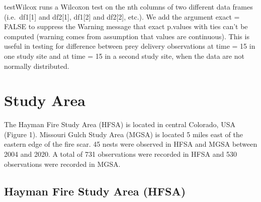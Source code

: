 \documentclass[]{article}
\newenvironment{Shaded}{\begin{snugshade}}{\end{snugshade}}
\newcommand{\CommentTok}[1]{\textcolor[rgb]{0.56,0.35,0.01}{\textit{#1}}}
\newcommand{\ControlFlowTok}[1]{\textcolor[rgb]{0.13,0.29,0.53}{\textbf{#1}}}
\newcommand{\DataTypeTok}[1]{\textcolor[rgb]{0.13,0.29,0.53}{#1}}
\newcommand{\KeywordTok}[1]{\textcolor[rgb]{0.13,0.29,0.53}{\textbf{#1}}}
\newcommand{\NormalTok}[1]{#1}
\newcommand{\OperatorTok}[1]{\textcolor[rgb]{0.81,0.36,0.00}{\textbf{#1}}}
\newcommand{\OtherTok}[1]{\textcolor[rgb]{0.56,0.35,0.01}{#1}}
\newcommand{\StringTok}[1]{\textcolor[rgb]{0.31,0.60,0.02}{#1}}
\begin{document}
testWilcox runs a Wilcoxon test on the nth columns of two different data
frames (i.e.~df1{[}1{]} and df2{[}1{]}, df1{[}2{]} and df2{[}2{]},
etc.). We add the argument exact = FALSE to suppress the Warning message
that exact p.values with ties can't be computed (warning comes from
assumption that values are continuous). This is useful in testing for
difference between prey delivery observations at time = 15 in one study
site and at time = 15 in a second study site, when the data are not
normally distributed.

\begin{Shaded}
\end{Shaded}

\hypertarget{study-area}{%
\section{Study Area}\label{study-area}}

The Hayman Fire Study Area (HFSA) is located in central Colorado, USA
(Figure 1). Missouri Gulch Study Area (MGSA) is located 5 miles east of
the eastern edge of the fire scar. 45 nests were observed in HFSA and
MGSA between 2004 and 2020. A total of 731 observations were recorded in
HFSA and 530 observations were recorded in MGSA.

\hypertarget{hayman-fire-study-area-hfsa}{%
\subsection{Hayman Fire Study Area
(HFSA)}\label{hayman-fire-study-area-hfsa}}
\end{document}

